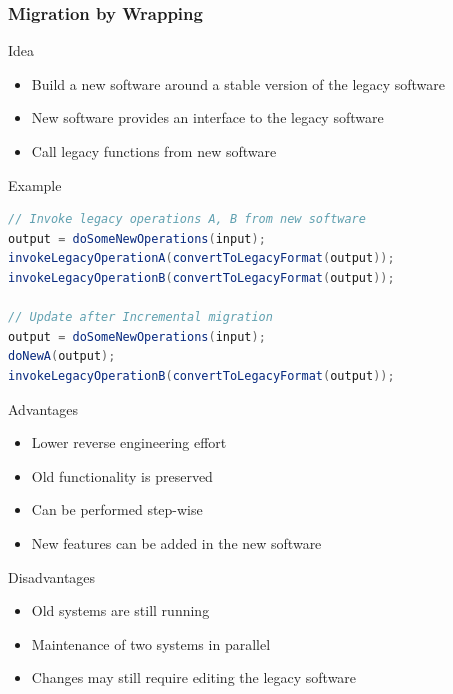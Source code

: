 \begin{frame}[fragile]
	\frametitle{Migration by Wrapping}
	\begin{fancycolumns}[widths={50,50}]
		\begin{definition}{Idea}
			\begin{itemize}
				\item Build a new software around a stable version of the legacy software
				\item New software provides an interface to the legacy software
				\item Call legacy functions from new software
			\end{itemize}
		\end{definition}
		\begin{example}{Example}
			\vspace{-3mm}
			\begin{lstlisting}[language=Java,basicstyle=\footnotesize]
// Invoke legacy operations A, B from new software
output = doSomeNewOperations(input);
invokeLegacyOperationA(convertToLegacyFormat(output));
invokeLegacyOperationB(convertToLegacyFormat(output));

// Update after Incremental migration
output = doSomeNewOperations(input);
doNewA(output);
invokeLegacyOperationB(convertToLegacyFormat(output));
			\end{lstlisting}
			\vspace{-3mm}
		\end{example}
		\nextcolumn
		\begin{definition}{Advantages}
			\begin{itemize}
				\item Lower reverse engineering effort
				\item Old functionality is preserved
				\item Can be performed step-wise
				\item New features can be added in the new software
			\end{itemize}
		\end{definition}
		\begin{note}{Disadvantages}
			\begin{itemize}
				\item Old systems are still running
				\item Maintenance of two systems in parallel
				\item Changes may still require editing the legacy software
			\end{itemize}
		\end{note}
	\end{fancycolumns}
\end{frame}


